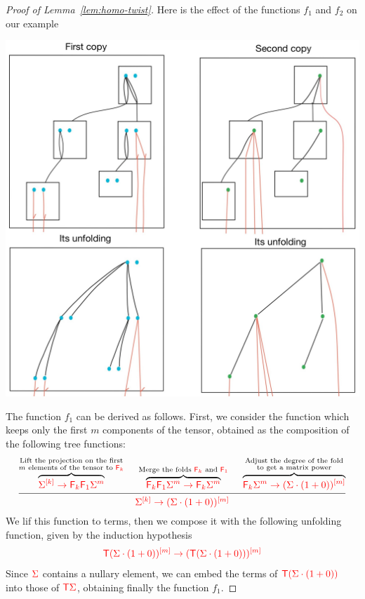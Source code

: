 \begin{proof}[Proof of Lemma~\ref{lem:homo-twist}]
Here is the effect of the functions $f_1$ and $f_2$ on our example
\begin{center}
\includegraphics[scale=.15]{MyPic30.jpg}
\end{center}
 The function $f_1$ can be derived as follows. First, we consider the function which keeps only the first $m$ components of the tensor, obtained as the composition of the following tree functions:
\begin{align*}
\begin{prooftree}
\Hypo{\overbrace{\ranked{\mati k \Sigma \to \reduce k \reduce 1 \Sigma^m}}^{\substack{\text{Lift the projection on the first}\\\text{$m$ elements of the tensor to $\reduce k$}}}}
\Hypo{\overbrace{\ranked{\reduce k \reduce 1 \Sigma^m \to \reduce k \Sigma^m}}^{\substack{\text{Merge the folds $\reduce k$ and $\reduce 1$}}}}
\Hypo{\overbrace{\ranked{\reduce k \Sigma^m \to \mati m {(\Sigma\cdot (1+0))}}}^{\substack{\text{Adjust the degree of the fold}\\\text{to get a matrix power}}}}
\Infer{3}[]{\ranked{\mati k \Sigma \to \mati m {(\Sigma\cdot (1+0))}}}
\end{prooftree}
\end{align*}
We lif this function to terms, then we compose it with the following unfolding function, given by the induction hypothesis
\begin{align*}
\ranked{\tmonad \mati m {(\Sigma\cdot (1+0))} \to \mati m {(\tmonad (\Sigma\cdot (1+0)))}}
\end{align*}
Since $\rSigma$ contains a nullary element, we can embed the terms of  $\ranked{\tmonad (\Sigma\cdot (1+0))}$ into those of $\ranked{\tmonad \Sigma}$, obtaining finally the function $f_1$.



\end{proof}
